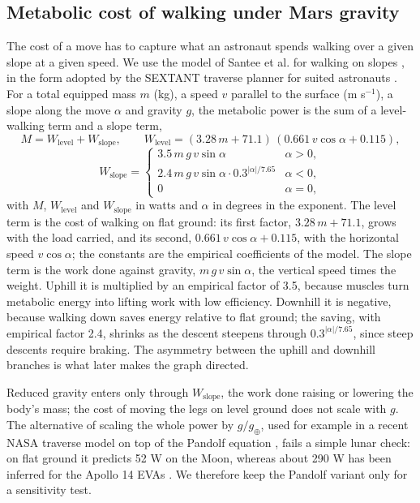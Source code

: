 \documentclass[11pt,a4paper]{article}
\begin{document}
\subsection{Metabolic cost of walking under Mars gravity}

The cost of a move has to capture what an astronaut spends walking over a given slope at a given speed. We use the model of Santee et al. for walking on slopes \cite{Santee2001}, in the form adopted by the SEXTANT traverse planner for suited astronauts \cite{Johnson2010}. For a total equipped mass $m$ (kg), a speed $v$ parallel to the surface (m s$^{-1}$), a slope along the move $\alpha$ and gravity $g$, the metabolic power is the sum of a level-walking term and a slope term, \[M = W_\text{level} + W_\text{slope},\qquad W_\text{level} = (3.28\,m + 71.1)\,(0.661\,v\cos\alpha + 0.115),\] \[W_\text{slope} = \begin{cases} 3.5\,m\,g\,v\sin\alpha & \alpha > 0,\\ 2.4\,m\,g\,v\sin\alpha\cdot 0.3^{|\alpha|/7.65} & \alpha < 0,\\ 0 & \alpha = 0,\end{cases}\] with $M$, $W_\text{level}$ and $W_\text{slope}$ in watts and $\alpha$ in degrees in the exponent. The level term is the cost of walking on flat ground: its first factor, $3.28\,m + 71.1$, grows with the load carried, and its second, $0.661\,v\cos\alpha + 0.115$, with the horizontal speed $v\cos\alpha$; the constants are the empirical coefficients of the model. The slope term is the work done against gravity, $m\,g\,v\sin\alpha$, the vertical speed times the weight. Uphill it is multiplied by an empirical factor of 3.5, because muscles turn metabolic energy into lifting work with low efficiency. Downhill it is negative, because walking down saves energy relative to flat ground; the saving, with empirical factor 2.4, shrinks as the descent steepens through $0.3^{|\alpha|/7.65}$, since steep descents require braking. The asymmetry between the uphill and downhill branches is what later makes the graph directed.

Reduced gravity enters only through $W_\text{slope}$, the work done raising or lowering the body's mass; the cost of moving the legs on level ground does not scale with $g$. The alternative of scaling the whole power by $g/g_\oplus$, used for example in a recent NASA traverse model \cite{Kim2025} on top of the Pandolf equation \cite{Pandolf1977}, fails a simple lunar check: on flat ground it predicts 52 W on the Moon, whereas about 290 W has been inferred for the Apollo 14 EVAs \cite{Carr2003}. We therefore keep the Pandolf variant only for a sensitivity test.
\end{document}
